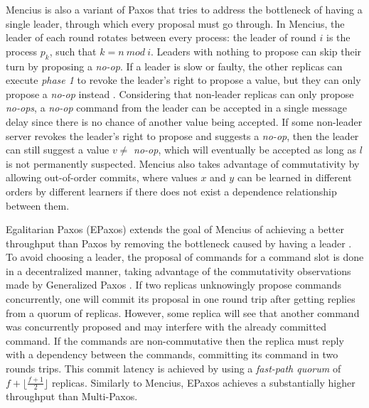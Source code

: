 Mencius is also a variant of Paxos that tries to address the bottleneck of having a single leader, through which every proposal must go through. In Mencius, the leader of each round rotates between every process: the leader of round $i$ is the process $p_k$, such that $k = n\ mod\ i$.  Leaders with nothing to propose can skip their turn by proposing a \textit{no-op}. If a leader is slow or faulty, the other replicas can execute \textit{phase 1} to revoke the leader's right to propose a value, but they can only propose a \textit{no-op} instead \cite{Mao2008}. Considering that non-leader replicas can only propose \textit{no-ops}, a \textit{no-op} command from the leader can be accepted in a single message delay since there is no chance of another value being accepted. If some non-leader server revokes the leader's right to propose and suggests a \textit{no-op}, then the leader can still suggest a value $v \neq$ \textit{no-op}, which will eventually be accepted as long as $l$ is not permanently suspected. Mencius also takes advantage of commutativity by allowing out-of-order commits, where values $x$ and $y$ can be learned in different orders by different learners if there does not exist a dependence relationship between them.

Egalitarian Paxos (EPaxos) extends the goal of Mencius of achieving a better throughput than Paxos by removing the bottleneck caused by having a leader \cite{Moraru2013}. To avoid choosing a leader, the proposal of commands for a command slot is done in a decentralized manner, taking advantage of the commutativity observations made by Generalized Paxos \cite{Lamport2005}. If two replicas unknowingly propose commands concurrently, one will commit its proposal in one round trip after getting replies from a quorum of replicas. However, some replica will see that another command was concurrently proposed and may interfere with the already committed command. If the commands are non-commutative then the replica must reply with a dependency between the commands, committing its command in two rounds trips. This commit latency is achieved by using a \textit{fast-path quorum} of $f+\lfloor\frac{f+1}{2}\rfloor$ replicas. Similarly to Mencius, EPaxos achieves a substantially higher throughput than Multi-Paxos.

